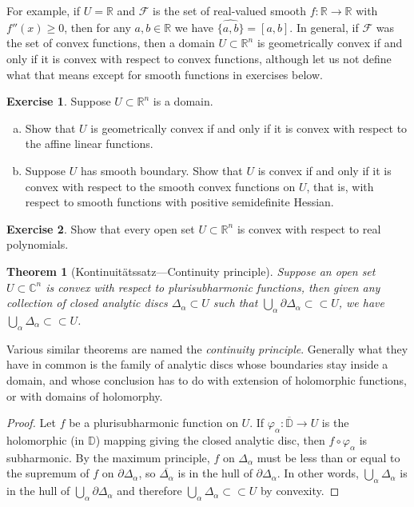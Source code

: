 \documentclass[12pt,openany]{book}
\newcommand{\C}{{\mathbb{C}}}
\newcommand{\R}{{\mathbb{R}}}
\newcommand{\D}{{\mathbb{D}}}
\newcommand{\sF}{{\mathscr{F}}}
\theoremstyle{plain}
\newtheorem{thm}{Theorem}[section]
\theoremstyle{remark}
\theoremstyle{definition}
\newenvironment{exbox}{%
    \def\FrameCommand{\vrule width 1pt \relax\hspace{10pt}}%
    \MakeFramed{\advance\hsize-\width\FrameRestore}%
}{%
    \endMakeFramed
}
\newenvironment{exparts}{%
    \leavevmode\begin{enumerate}[a),noitemsep,topsep=0pt,parsep=0pt,partopsep=0pt]
}{%
    \end{enumerate}
}
\theoremstyle{exercise}
\newtheorem{exercise}{Exercise}[section]
\theoremstyle{example}
\begin{document}
For example, if $U=\R$ and $\sF$ is the set of real-valued smooth
$f \colon \R \to \R$ with $f''(x) \geq 0$, then for any $a,b \in \R$
we have $\widehat{\{ a, b \}} = [a,b]$.
In general, if $\sF$ was the set of convex functions, then 
a domain $U \subset \R^n$ is geometrically convex if and only if it is
convex with respect to convex functions, although let us not define
what that means except for smooth functions in exercises below.

\begin{exbox}
\begin{exercise} \label{exercise:geomconvexfuncs}
Suppose $U \subset \R^n$ is a domain.
\begin{exparts}
\item
Show that $U$
is geometrically convex if and only if it is
convex with respect to the affine linear functions.
\item
Suppose $U$
has smooth boundary.
Show that $U$ is 
convex if and only if it is
convex with respect to the smooth convex functions on $U$,
that is, with respect to smooth functions with positive semidefinite Hessian.
\end{exparts}
\end{exercise}

\begin{exercise}
Show that every open set $U \subset \R^n$ is convex with respect to real
polynomials.
\end{exercise}
\end{exbox}

\begin{thm}[Kontinuit\"atssatz---Continuity
principle]
\label{thm:contprinciple}
Suppose an open set $U \subset \C^n$ is convex with respect to plurisubharmonic
functions,
then given any collection of closed analytic discs $\Delta_\alpha \subset U$
such that $\bigcup_\alpha \partial \Delta_\alpha \subset \subset U$,
we have
$\bigcup_\alpha \Delta_\alpha \subset \subset U$.
\end{thm}

Various similar theorems are named the \emph{continuity principle}.
Generally what they have in common is the family of analytic discs whose
boundaries stay inside a domain, and whose conclusion has to do
with extension of holomorphic functions, or with domains of holomorphy.

\begin{proof}
Let $f$ be a plurisubharmonic function on $U$.  If $\varphi_\alpha \colon
\overline{\D} \to U$ is the holomorphic (in $\D$) mapping giving the closed
analytic disc, then $f \circ \varphi_\alpha$ is subharmonic.
By the maximum principle,
$f$ on $\Delta_\alpha$ must be less than or equal to the supremum
of $f$ on $\partial \Delta_\alpha$, so $\overline{\Delta_\alpha}$
is in the hull of 
$\partial \Delta_\alpha$.
In other words,
$\bigcup_\alpha \Delta_\alpha$ is in the hull of
$\bigcup_\alpha \partial \Delta_\alpha$ and therefore 
$\bigcup_\alpha \Delta_\alpha \subset \subset U$ by convexity.
\end{proof}
\end{document}
